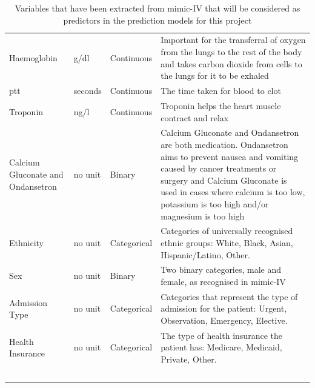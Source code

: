 \documentclass[11pt]{article}
\begin{document}
{{\begin{center}
\begin{longtable}{ |L{2cm} | L{2cm} | L{2cm} | 
 L{7cm} |}
    \noalign{\global\setlength{\arrayrulewidth}{0.05mm}}
    \hline
    \noalign{\global\setlength{\arrayrulewidth}{0.7mm}}
  Haemoglobin & \gls{g/dl} & Continuous & Important for the transferral of oxygen from the lungs to the rest of the body and takes carbon dioxide from cells to the lungs for it to be exhaled \\ 
    \noalign{\global\setlength{\arrayrulewidth}{0.05mm}}
    \hline
    \noalign{\global\setlength{\arrayrulewidth}{0.7mm}}
 \gls{ptt} & seconds & Continuous & The time taken for blood to clot\\ 
    \noalign{\global\setlength{\arrayrulewidth}{0.05mm}}
    \hline
    \noalign{\global\setlength{\arrayrulewidth}{0.7mm}}
  Troponin & \gls{ng/l} & Continuous & Troponin helps the heart muscle contract and relax \\ 
    \noalign{\global\setlength{\arrayrulewidth}{0.05mm}}
    \hline
    \noalign{\global\setlength{\arrayrulewidth}{0.7mm}}
  Calcium Gluconate and Ondansetron & no unit & Binary & Calcium Gluconate and Ondansetron are both medication. Ondansetron aims to prevent nausea and vomiting caused by cancer treatments or surgery and Calcium Gluconate is used in cases where calcium is too low, potassium is too high and/or magnesium is too high\\ 
    \noalign{\global\setlength{\arrayrulewidth}{0.05mm}}
    \hline
    \noalign{\global\setlength{\arrayrulewidth}{0.7mm}}
 Ethnicity & no unit & Categorical & Categories of universally recognised ethnic groups: White, Black, Asian, Hispanic/Latino, Other.\\ 
    \noalign{\global\setlength{\arrayrulewidth}{0.05mm}}
    \hline
    \noalign{\global\setlength{\arrayrulewidth}{0.7mm}}
  Sex & no unit & Binary & Two binary categories, male and female, as recognised in \gls{mimic}-IV  \\ 
    \noalign{\global\setlength{\arrayrulewidth}{0.05mm}}
    \hline
    \noalign{\global\setlength{\arrayrulewidth}{0.7mm}}
  Admission Type & no unit & Categorical & Categories that represent the type of admission for the patient: Urgent, Observation, Emergency, Elective.\\ 
    \noalign{\global\setlength{\arrayrulewidth}{0.05mm}}
    \hline
    \noalign{\global\setlength{\arrayrulewidth}{0.7mm}}
  Health Insurance & no unit & Categorical & The type of health insurance the patient has: Medicare, Medicaid, Private, Other. \\ 
    \hline
\caption[Covariates]{Variables that have been extracted from \gls{mimic}-IV that will be considered as predictors in the prediction models for this project}\label{tab:my_label}\
\end{longtable}
\end{center}}}
\normalsize
\end{document}
